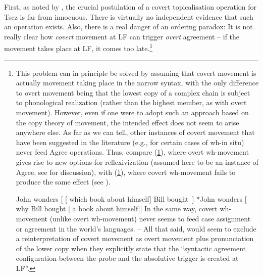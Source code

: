 \documentclass[output=paper
,modfonts
,nonflat]{langsci/langscibook}
\begin{document}
	First, as noted by \cite{Boskovic:07}, the crucial postulation of a
	covert topicalisation operation for Tsez is far from innocuous. There
	is virtually no independent evidence that such an operation
	exists. Also, there is a real danger of an ordering paradox: It is not
	really clear how {\itshape covert} movement at LF can trigger {\itshape overt}
	agreement -- if the movement takes place at LF, it comes too
	late.\footnote{This problem  can in principle be solved by assuming
		that covert movement is actually movement taking place in the
		narrow syntax, with the only difference to overt movement being that
		the lowest copy of a complex chain is subject to phonological
		realization (rather than the highest member, as with overt movement).
		However, even if one were to adopt such an approach based on the copy
		theory of movement, the intended effect does not seem to arise
		anywhere else. As far as we can tell, other instances of covert
		movement that have been suggested in the literature (e.g., for certain
		cases of wh-in situ) never feed Agree operations. Thus, compare (\ref{ex:mueller:Fn8a}),
		where overt wh-movement gives rise to new options for reflexivization
		(assumed here to be an instance of Agree, see \citealt{Reuland:11} for
		discussion), with (\ref{ex:mueller:Fn8b}), where covert wh-movement fails to produce the
		same effect (see \citealt{Barss:86}). 
		
		\ea\label{ex:mueller:Fn8}
		\ea\label{ex:mueller:Fn8a}{John wonders [ [ which book about himself] Bill bought~]}
		\ex\label{ex:mueller:Fn8b}*{John wonders [ why Bill bought [ a book about himself]]}
		\z
		\z
		In the same way, covert wh-movement (unlike overt wh-movement) never seems to feed case
		assignment or agreement in the world's languages. -- 
		All  that said, \citet[626]{PolinskyPotsdam:01} would seem to 
		exclude a reinterpretation of covert movement as overt movement plus
		pronunciation of the lower copy when they explicitly state that the
		``syntactic agreement configuration between the probe and the
		absolutive trigger is created at LF''.}
	
\end{document}
